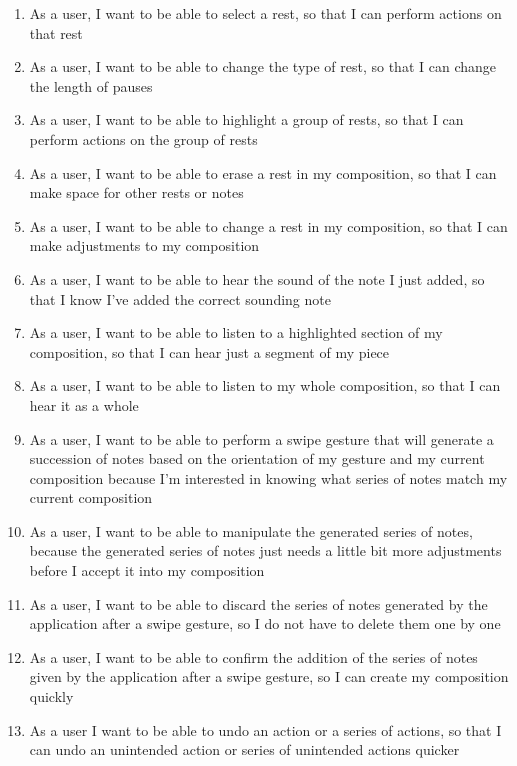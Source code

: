 \begin{enumerate}
\item As a user, I want to be able to select a rest, so that I can perform actions on that rest
\item As a user, I want to be able to change the type of rest, so that I can change the length of pauses
\item As a user, I want to be able to highlight a group of rests, so that I can perform actions on the group of rests
\item As a user, I want to be able to erase a rest in my composition, so that I can make space for other rests or notes
\item As a user, I want to be able to change a rest in my composition, so that I can make adjustments to my composition
\item As a user, I want to be able to hear the sound of the note I just added, so that I know I've added the correct sounding note
\item As a user, I want to be able to listen to a highlighted section of my composition, so that I can hear just a segment of my piece
\item As a user, I want to be able to listen to my whole composition, so that I can hear it as a whole
\item As a user, I want to be able to perform a swipe gesture that will generate a succession of notes based on the orientation of my gesture and my current composition because I'm interested in knowing what series of notes match my current composition
\item As a user, I want to be able to manipulate the generated series of notes, because the generated series of notes just needs a little bit more adjustments before I accept it into my composition
\item As a user, I want to be able to discard the series of notes generated by the application after a swipe gesture, so I do not have to delete them one by one
\item As a user, I want to be able to confirm the addition of the series of notes given by the application after a swipe gesture, so I can create my composition quickly
\item As a user I want to be able to undo an action or a series of actions, so that I can undo an unintended action or series of unintended actions quicker

\end{enumerate}
